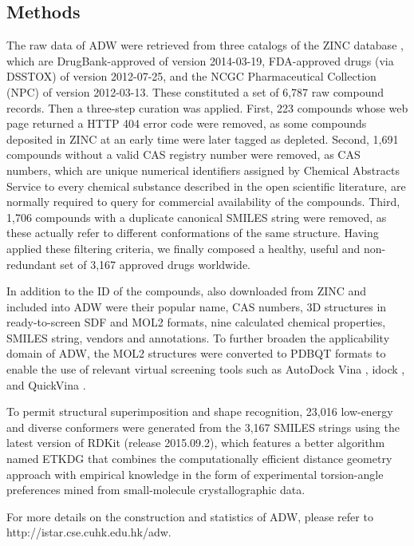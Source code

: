 \documentclass{bioinfo}
\begin{document}
\begin{methods}
\section{Methods}

The raw data of ADW were retrieved from three catalogs of the ZINC database \citep{1178}, which are DrugBank-approved \citep{1594} of version 2014-03-19, FDA-approved drugs (via DSSTOX) of version 2012-07-25, and the NCGC Pharmaceutical Collection (NPC) \citep{1608} of version 2012-03-13. These constituted a set of 6,787 raw compound records. Then a three-step curation was applied. First, 223 compounds whose web page returned a HTTP 404 error code were removed, as some compounds deposited in ZINC at an early time were later tagged as depleted. Second, 1,691 compounds without a valid CAS registry number were removed, as CAS numbers, which are unique numerical identifiers assigned by Chemical Abstracts Service to every chemical substance described in the open scientific literature, are normally required to query for commercial availability of the compounds. Third, 1,706 compounds with a duplicate canonical SMILES string were removed, as these actually refer to different conformations of the same structure. Having applied these filtering criteria, we finally composed a healthy, useful and non-redundant set of 3,167 approved drugs worldwide.


In addition to the ID of the compounds, also downloaded from ZINC and included into ADW were their popular name, CAS numbers, 3D structures in ready-to-screen SDF and MOL2 formats, nine calculated chemical properties, SMILES string, vendors and annotations. To further broaden the applicability domain of ADW, the MOL2 structures were converted to PDBQT formats to enable the use of relevant virtual screening tools such as AutoDock Vina \citep{595}, idock \citep{1362}, and QuickVina \citep{1664}.


To permit structural superimposition and shape recognition, 23,016 low-energy and diverse conformers were generated from the 3,167 SMILES strings using the latest version of RDKit (release 2015.09.2), which features a better algorithm named ETKDG \citep{1697} that combines the computationally efficient distance geometry approach with empirical knowledge in the form of experimental torsion-angle preferences mined from small-molecule crystallographic data.


For more details on the construction and statistics of ADW, please refer to http://istar.cse.cuhk.edu.hk/adw.

\end{methods}
\end{document}
